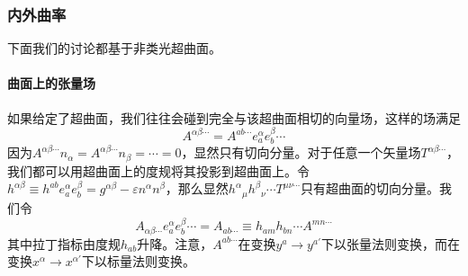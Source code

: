 \documentclass[hyperref, UTF8, a4paper]{ctexart}
\begin{document}
\subsubsection{内外曲率}

下面我们的讨论都基于非类光超曲面。
\paragraph{曲面上的张量场}

如果给定了超曲面，我们往往会碰到完全与该超曲面相切的向量场，这样的场满足
\begin{equation*}
	A^{\alpha \beta \cdots } =A^{ab\cdots } e_{a}^{\alpha } e_{b}^{\beta } \cdots 
\end{equation*}
因为$A^{\alpha \beta \cdots } n_{\alpha } =A^{\alpha \beta \cdots } n_{\beta } =\cdots =0$，显然只有切向分量。对于任意一个矢量场$T^{\alpha \beta \cdots }$，我们都可以用超曲面上的度规将其投影到超曲面上。令$h^{\alpha \beta } \equiv h^{ab} e_{a}^{\alpha } e_{b}^{\beta } =g^{\alpha \beta } -\varepsilon n^{\alpha } n^{\beta }$，那么显然$h^{\alpha }{}_{\mu } h^{\beta }{}_{\nu } \cdots T^{\mu \nu \cdots }$只有超曲面的切向分量。我们令
\begin{equation*}
	A_{\alpha \beta \cdots } e_{a}^{\alpha } e_{b}^{\beta } \cdots =A_{ab\cdots } \equiv h_{am} h_{bn} \cdots A^{mn\cdots }
\end{equation*}
其中拉丁指标由度规$h_{ab}$升降。注意，$A^{ab\cdots }$在变换$y^{a}\rightarrow y^{a'}$下以张量法则变换，而在变换$x^{\alpha }\rightarrow x^{\alpha '}$下以标量法则变换。
\end{document}
